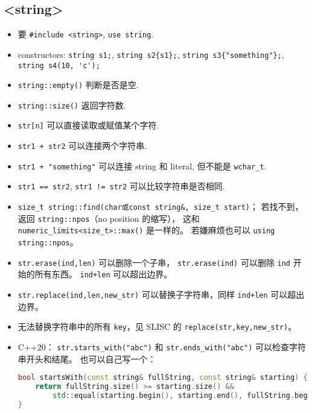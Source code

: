 \subsection{<string>}
\begin{itemize}
\item 要 \verb`#include <string>`, \verb`use string`.
\item constructors: \verb`string s1;`, \verb`string s2{s1};`, \verb`string s3{"something"};`, \verb`string s4(10, 'c');`
\item \verb`string::empty()` 判断是否是空.
\item \verb`string::size()` 返回字符数.
\item \verb`str[n]` 可以直接读取或赋值某个字符.
\item \verb`str1 + str2` 可以连接两个字符串.
\item \verb`str1 + "something"` 可以连接 string 和 literal, 但不能是 \verb`wchar_t`.
\item \verb`str1 == str2`, \verb`str1 != str2` 可以比较字符串是否相同.
\item \verb|size_t string::find(char或const string&, size_t start)|； 若找不到， 返回 \verb|string::npos|（no position 的缩写）， 这和 \verb|numeric_limits<size_t>::max()| 是一样的。 若嫌麻烦也可以 \verb|using string::npos|。
\item \verb|str.erase(ind,len)| 可以删除一个子串， \verb|str.erase(ind)| 可以删除 \verb|ind| 开始的所有东西。 \verb|ind+len| 可以超出边界。
\item \verb|str.replace(ind,len,new_str)| 可以替换子字符串，同样 \verb|ind+len| 可以超出边界。
\item 无法替换字符串中的所有 \verb|key|，见 SLISC 的 \verb|replace(str,key,new_str)|。
\item C++20： \verb|str.starts_with("abc")| 和 \verb|str.ends_with("abc")| 可以检查字符串开头和结尾。 也可以自己写一个：
\begin{lstlisting}[language=cpp]
bool startsWith(const string& fullString, const string& starting) {
    return fullString.size() >= starting.size() &&
        std::equal(starting.begin(), starting.end(), fullString.begin());
}
\end{lstlisting}
\end{itemize}

